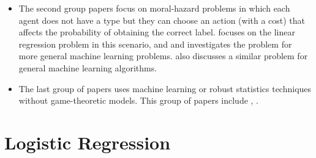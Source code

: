 \documentclass{article}
\begin{document}
\begin{itemize}
\item The second group papers focus on moral-hazard problems in which each agent does not have a type but they can choose an action (with a cost) that affects the probability of obtaining the correct label. \citet*{richardsonprivately} focuses on the linear regression problem in this scenario, and \citet*{cai2015optimum} and \citet*{shah2016double} investigates the problem for more general machine learning problems. \citet*{mihailescu2010strategy} also discusses a similar problem for general machine learning algorithms.
\item The last group of papers uses machine learning or robust statistics techniques without game-theoretic models. This group of papers include \citet*{dekel2009vox}, \citet*{dekel2009good}.
\end{itemize}



\section{Logistic Regression} 
\end{document}
